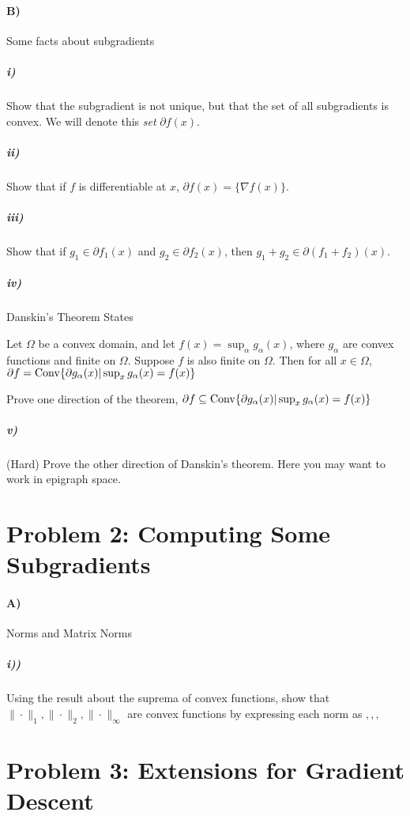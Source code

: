 \documentclass[12pt]{article}
\begin{document}
\paragraph{B)} Some facts about subgradients

\subparagraph{i)} Show that the subgradient is not unique, but that the set of all subgradients is convex. We will denote this \emph{set} $\partial f(x)$.

\subparagraph{ii)} Show that if $f$ is differentiable at $x$, $\partial f(x) = \{\nabla f(x)\}$. 

\subparagraph{iii)} Show that if $g_1 \in \partial f_1(x)$ and $g_2 \in \partial f_2(x)$, then $g_1 + g_2 \in \partial(f_1 + f_2)(x)$. 


\subparagraph{iv)} Danskin's Theorem States
\begin{theorem*}[Danskin] Let $\Omega$ be a convex domain, and let $f(x) = \sup_{\alpha} g_{\alpha}(x)$, where $g_{\alpha}$ are convex functions and finite on $\Omega$. Suppose $f$ is also finite on $\Omega$. Then for all $x \in \Omega$, $\partial f = \mathrm{Conv} \{\partial g_{\alpha}(x) | \sup_{x} g_{\alpha}(x) =f(x) \}$
\end{theorem*}
Prove one direction of the theorem, $\partial f \subseteq \mathrm{Conv} \{\partial g_{\alpha}(x) | \sup_{x} g_{\alpha}(x) =f(x) \}$


\subparagraph{v)} (Hard) Prove the other direction of Danskin's theorem. Here you may want to work in epigraph space. 


\section*{Problem 2: Computing Some Subgradients}
\paragraph{A)} Norms and Matrix Norms
\subparagraph{i))} Using the result about the suprema of convex functions, show that $\|\cdot\|_1,\|\cdot\|_2,\|\cdot\|_{\infty}$ are convex functions by expressing each norm as $,,,$



\section*{Problem 3: Extensions for Gradient Descent}
\end{document}
